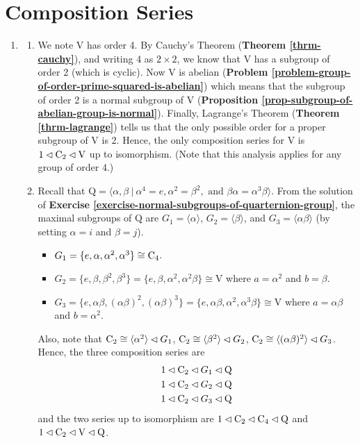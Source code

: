 \section{Composition Series}
\begin{enumerate}
    \item \begin{enumerate}[label=(\roman*)]
        \item We note $\mathrm{V}$ has order 4. By Cauchy's Theorem (\textbf{Theorem \ref{thrm-cauchy}}), and writing 4 as $2 \times 2$, we know that $\mathrm{V}$ has a subgroup of order 2 (which is cyclic). Now $\mathrm{V}$ is abelian (\textbf{Problem \ref{problem-group-of-order-prime-squared-is-abelian}}) which means that the subgroup of order 2 is a normal subgroup of $\mathrm{V}$ (\textbf{Proposition \ref{prop-subgroup-of-abelian-group-is-normal}}). Finally, Lagrange's Theorem (\textbf{Theorem \ref{thrm-lagrange}}) tells us that the only possible order for a proper subgroup of $\mathrm{V}$ is 2. Hence, the only composition series for $\mathrm{V}$ is $1 \lhd \mathrm{C}_{2} \lhd \mathrm{V}$ up to isomorphism.\newline
        (Note that this analysis applies for any group of order 4.)
        
        \item Recall that $\mathrm{Q} = \langle \alpha, \beta \ | \ \alpha^4 = e, \alpha^2 = \beta^2, \text{ and } \beta\alpha = \alpha^3\beta \rangle$. From the solution of \textbf{Exercise \ref{exercise-normal-subgroups-of-quarternion-group}}, the maximal subgroups of $\mathrm{Q}$ are $G_1 = \langle \alpha \rangle$, $G_2 = \langle \beta \rangle$, and $G_3 = \langle \alpha\beta \rangle$ (by setting $\alpha = i$ and $\beta = j$).
        \begin{itemize}
            \item $G_1 = \{e, \alpha, \alpha^2, \alpha^3\} \cong \mathrm{C}_{4}$.
            \item $G_2 = \{e, \beta, \beta^2, \beta^3\} = \{e, \beta, \alpha^2, \alpha^2\beta\} \cong \mathrm{V}$ where $a = \alpha^2$ and $b = \beta$.
            \item $G_3 = \{e, \alpha\beta, (\alpha\beta)^2, (\alpha\beta)^3\} = \{e, \alpha\beta, \alpha^2, \alpha^3\beta\} \cong \mathrm{V}$ where $a = \alpha\beta$ and $b = \alpha^2$.
        \end{itemize}
        Also, note that $\mathrm{C}_{2} \cong \langle \alpha^2 \rangle \lhd G_1$, $\mathrm{C}_{2} \cong \langle \beta^2 \rangle \lhd G_2$, $\mathrm{C}_{2} \cong \langle (\alpha\beta)^2 \rangle \lhd G_3$. Hence, the three composition series are
        \begin{align*}
            &1 \lhd \mathrm{C}_{2} \lhd G_1 \lhd \mathrm{Q}\\
            &1 \lhd \mathrm{C}_{2} \lhd G_2 \lhd \mathrm{Q}\\
            &1 \lhd \mathrm{C}_{2} \lhd G_3 \lhd \mathrm{Q}
        \end{align*}
        and the two series up to isomorphism are $1 \lhd \mathrm{C}_{2} \lhd \mathrm{C}_{4} \lhd \mathrm{Q}$ and $1 \lhd \mathrm{C}_{2} \lhd \mathrm{V} \lhd \mathrm{Q}$.
        

\end{enumerate}
\end{enumerate}

